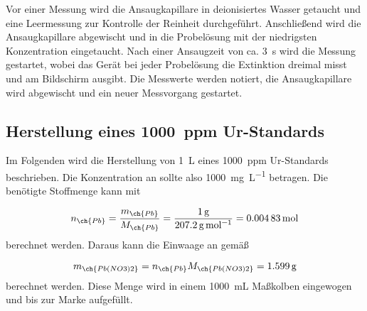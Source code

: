   Vor einer Messung wird die Ansaugkapillare in deionisiertes Wasser getaucht und eine Leermessung zur Kontrolle der Reinheit durchgeführt. Anschließend wird die Ansaugkapillare abgewischt und in die Probelösung mit der niedrigsten Konzentration eingetaucht. Nach einer Ansaugzeit von ca. \SI[mode=text]{3}{s} wird die Messung gestartet, wobei das Gerät bei jeder Probelösung die Extinktion dreimal misst und am Bildschirm ausgibt. Die Messwerte werden notiert, die Ansaugkapillare wird abgewischt und ein neuer Messvorgang gestartet.
  
    \subsection{Herstellung eines \SI[mode=text]{1000}{ppm}  Ur-Standards}
    
      Im Folgenden wird die Herstellung von \SI[mode=text]{1}{\liter} eines \SI[mode=text]{1000}{ppm}  Ur-Standards beschrieben. Die Konzentration an  sollte also \SI[mode=text]{1000}{\milli\gram\per\liter} betragen. Die benötigte Stoffmenge kann mit 
        
        \begin{equation}
          n_{\ch{Pb}} = \frac{m_{\ch{Pb}}}{M_{\ch{Pb}}} = \frac{\SI[mode=text]{1}{\gram}}{\SI[mode=text]{207.2}{\gram\per\mole}} = \SI[mode=text]{0.00483}{\mole}
        \end{equation}   
      berechnet werden. Daraus kann die Einwaage an  gemäß 
        
        \begin{equation}
          m_{\ch{Pb(NO3)2}} = n_{\ch{Pb}} M_{\ch{Pb(NO3)2}} = \SI[mode=text]{1.599}{\gram}
        \end{equation}
      berechnet werden. Diese Menge wird in einem \SI[mode=text]{1000}{\milli\liter} Maßkolben eingewogen und bis zur Marke aufgefüllt. 
           